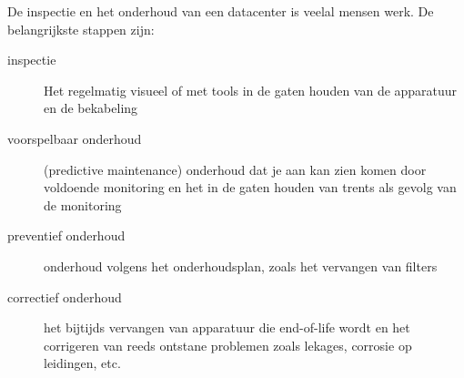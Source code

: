 De inspectie en het onderhoud van een datacenter is veelal mensen werk. De belangrijkste stappen zijn:
\begin{description}
\item[inspectie] Het regelmatig visueel of met tools in de gaten houden van de apparatuur en de bekabeling
\item[voorspelbaar onderhoud] (predictive maintenance) onderhoud dat je aan kan zien komen door voldoende monitoring en het in de gaten houden van trents als gevolg van de monitoring
\item[preventief onderhoud] onderhoud volgens het onderhoudsplan, zoals het vervangen van filters
\item[correctief onderhoud] het bijtijds vervangen van apparatuur die end-of-life wordt en het corrigeren van reeds ontstane problemen zoals lekages, corrosie op leidingen, etc.
\end{description}

